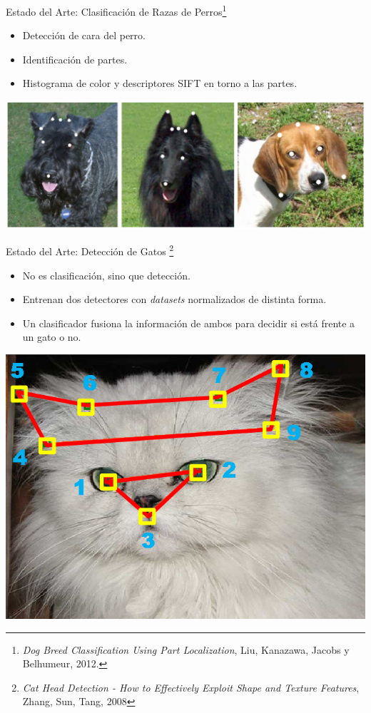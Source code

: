 \documentclass{beamer}
\begin{document}
    \begin{frame}{Estado del Arte: Clasificación de Razas de
            Perros\footnote{\emph{Dog Breed Classification Using Part
        Localization}, Liu, Kanazawa, Jacobs y Belhumeur, 2012. }}
        \begin{itemize}
            \item Detección de cara del perro.
            \item Identificación de partes.
            \item Histograma de color y descriptores SIFT en torno a las partes.
        \end{itemize}
        \begin{center}
            \includegraphics[scale=0.15]{imagen/dogannotation}
        \end{center}
	\end{frame}
    \begin{frame}{Estado del Arte: Detección de Gatos \footnote{\emph{Cat Head
        Detection - How to Effectively Exploit Shape and Texture Features},
Zhang, Sun, Tang, 2008}}
        \begin{itemize}
            \item No es clasificación, sino que detección.
            \item Entrenan dos detectores con \emph{datasets} normalizados de
                distinta forma.
            \item Un clasificador fusiona la información de ambos para decidir
                si está frente a un gato o no.
        \end{itemize}
        \begin{center}
            \includegraphics[scale=0.25]{imagen/annotation}
        \end{center}
    \end{frame}
\end{document}
